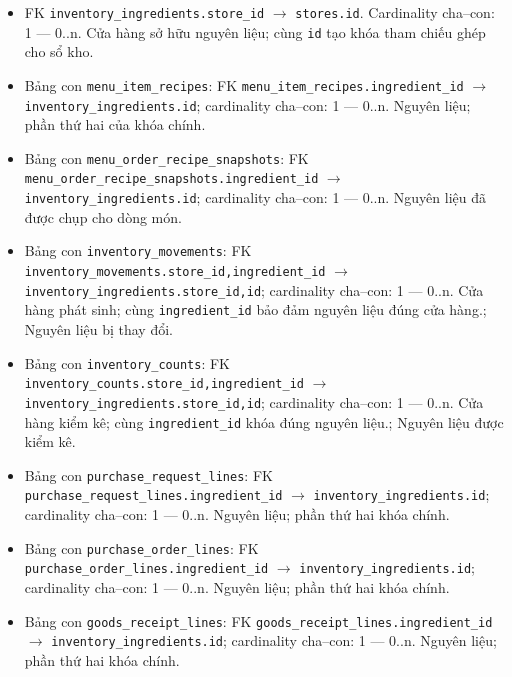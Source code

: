 \begin{itemize}

\item FK \texttt{inventory\_ingredients.store\_id} $\rightarrow$ \texttt{stores.id}. Cardinality cha--con: 1 — 0..n. Cửa hàng sở hữu nguyên liệu; cùng \texttt{id} tạo khóa tham chiếu ghép cho sổ kho.

\item Bảng con \texttt{menu\_item\_recipes}: FK \texttt{menu\_item\_recipes.ingredient\_id} $\rightarrow$ \texttt{inventory\_ingredients.id}; cardinality cha--con: 1 — 0..n. Nguyên liệu; phần thứ hai của khóa chính.

\item Bảng con \texttt{menu\_order\_recipe\_snapshots}: FK \texttt{menu\_order\_recipe\_snapshots.ingredient\_id} $\rightarrow$ \texttt{inventory\_ingredients.id}; cardinality cha--con: 1 — 0..n. Nguyên liệu đã được chụp cho dòng món.

\item Bảng con \texttt{inventory\_movements}: FK \texttt{inventory\_movements.store\_id,ingredient\_id} $\rightarrow$ \texttt{inventory\_ingredients.store\_id,id}; cardinality cha--con: 1 — 0..n. Cửa hàng phát sinh; cùng \texttt{ingredient\_id} bảo đảm nguyên liệu đúng cửa hàng.; Nguyên liệu bị thay đổi.

\item Bảng con \texttt{inventory\_counts}: FK \texttt{inventory\_counts.store\_id,ingredient\_id} $\rightarrow$ \texttt{inventory\_ingredients.store\_id,id}; cardinality cha--con: 1 — 0..n. Cửa hàng kiểm kê; cùng \texttt{ingredient\_id} khóa đúng nguyên liệu.; Nguyên liệu được kiểm kê.

\item Bảng con \texttt{purchase\_request\_lines}: FK \texttt{purchase\_request\_lines.ingredient\_id} $\rightarrow$ \texttt{inventory\_ingredients.id}; cardinality cha--con: 1 — 0..n. Nguyên liệu; phần thứ hai khóa chính.

\item Bảng con \texttt{purchase\_order\_lines}: FK \texttt{purchase\_order\_lines.ingredient\_id} $\rightarrow$ \texttt{inventory\_ingredients.id}; cardinality cha--con: 1 — 0..n. Nguyên liệu; phần thứ hai khóa chính.

\item Bảng con \texttt{goods\_receipt\_lines}: FK \texttt{goods\_receipt\_lines.ingredient\_id} $\rightarrow$ \texttt{inventory\_ingredients.id}; cardinality cha--con: 1 — 0..n. Nguyên liệu; phần thứ hai khóa chính.

\end{itemize}

